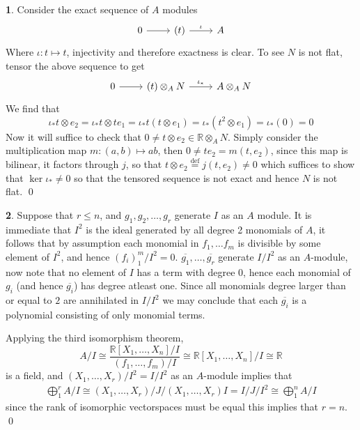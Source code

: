\documentclass[11pt]{article}
\theoremstyle{definition}
\newtheorem{pb}{}
\begin{document}
    \begin{pb}
        Consider the exact sequence of \(A\) modules
        \begin{equation*}
            \begin{tikzcd}
                0 \arrow[r,"{}"] &(t) \arrow[r,"{\iota}"] & A
            \end{tikzcd}
        \end{equation*}
        Where \(\iota: t\mapsto t\), injectivity and therefore exactness is clear. To see \(N\) is not flat, tensor the above sequence to get
        \begin{equation*}
            \begin{tikzcd}
                0 \arrow[r,"{}"] &(t)\otimes_A N \arrow[r,"{\iota_*}"] &A \otimes_A N
            \end{tikzcd}
        \end{equation*}
        We find that \[\iota_* t \otimes e_2 = \iota_*t\otimes te_1 = \iota_* t(t \otimes e_1) = \iota_*(t^2 \otimes e_1) = \iota_*(0) = 0\]
        Now it will suffice to check that \(0 \neq t \otimes e_2 \in \mathbb{R} \otimes_A N\). Simply consider the multiplication map \(m:(a,b) \mapsto ab\), then \(0 \neq te_2 = m(t,e_2)\), since this map is bilinear, it factors through \(j\), so that \(t \otimes e_2 \overset{\text{def}}{=} j(t,e_2) \neq 0\) which suffices to show that \(\ker \iota_* \neq 0\) so that the tensored sequence is not exact and hence \(N\) is not flat. \qed
    \end{pb}
    \begin{pb}
        Suppose that \(r \leq n\), and \(g_1,g_2,\hdots,g_r\) generate \(I\) as an \(A\) module. It is immediate that \(I^2\) is the ideal generated by all degree 2 monomials of \(A\), it follows that by assumption each monomial in \(f_1,\hdots f_m\) is divisible by some element of \(I^2\), and hence \((f_i)_1^m/I^2 = 0\).
        \(\overline{g_1},\hdots,\overline{g_r}\) generate \(I/I^2\) as an \(A\)-module, now note that no element of \(I\) has a term with degree \(0\), hence each monomial of \(g_i\) (and hence \(\overline{g_i}\)) has degree atleast one. Since all monomials degree larger than or equal to \(2\) are annihilated in \(I/I^2\) we may conclude that each \(\overline{g_i}\) is a polynomial consisting of only monomial terms.

        Applying the third isomorphism theorem, \[A/I \cong \frac{\mathbb{R}[X_1,\hdots,X_n]/I}{(f_1,\hdots,f_m)/I} \cong \mathbb{R}[X_1,\hdots,X_n]/I \cong \mathbb{R}\] is a field, and \((X_1,\hdots,X_r)/I^2 = I/I^2\) as an \(A\)-module implies that
        \begin{align*}
            \bigoplus_1^r A/I \cong (X_1,\hdots,X_r)/J/(X_1,\hdots,X_r)I = I/J/I^2 \cong \bigoplus_1^n A/I
        \end{align*}
        since the rank of isomorphic vectorspaces must be equal this implies that \(r = n\). \qed
    \end{pb}
\end{document}
